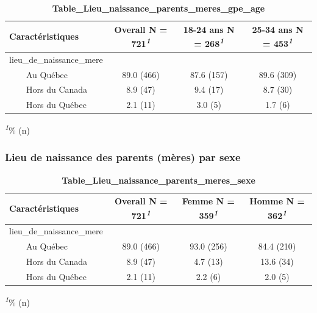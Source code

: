 \documentclass[
]{article}
\begin{document}
\newpage
\begin{table}[!t]
\caption{\label{tab:unnamed-chunk-29}\textbf{Table\_Lieu\_naissance\_parents\_meres\_gpe\_age}} 
\fontsize{12.0pt}{14.4pt}\selectfont
\begin{tabular*}{\linewidth}{@{\extracolsep{\fill}}lccc}
\toprule
\textbf{Caractéristiques} & \textbf{Overall}  N = 721\textsuperscript{\textit{1}} & \textbf{18-24 ans}  N = 268\textsuperscript{\textit{1}} & \textbf{25-34 ans}  N = 453\textsuperscript{\textit{1}} \\ 
\midrule\addlinespace[2.5pt]
lieu\_de\_naissance\_mere &  &  &  \\ 
    Au Québec & 89.0 (466) & 87.6 (157) & 89.6 (309) \\ 
    Hors du Canada & 8.9 (47) & 9.4 (17) & 8.7 (30) \\ 
    Hors du Québec & 2.1 (11) & 3.0 (5) & 1.7 (6) \\ 
\bottomrule
\end{tabular*}
\begin{minipage}{\linewidth}
\textsuperscript{\textit{1}}\% (n)\\
\end{minipage}
\end{table}

\vspace{2cm}

\hypertarget{lieu-de-naissance-des-parents-muxe8res-par-sexe}{%
\subsubsection{Lieu de naissance des parents (mères) par
sexe}\label{lieu-de-naissance-des-parents-muxe8res-par-sexe}}

\newpage
\begin{table}[!t]
\caption{\label{tab:unnamed-chunk-30}\textbf{Table\_Lieu\_naissance\_parents\_meres\_sexe}} 
\fontsize{12.0pt}{14.4pt}\selectfont
\begin{tabular*}{\linewidth}{@{\extracolsep{\fill}}lccc}
\toprule
\textbf{Caractéristiques} & \textbf{Overall}  N = 721\textsuperscript{\textit{1}} & \textbf{Femme}  N = 359\textsuperscript{\textit{1}} & \textbf{Homme}  N = 362\textsuperscript{\textit{1}} \\ 
\midrule\addlinespace[2.5pt]
lieu\_de\_naissance\_mere &  &  &  \\ 
    Au Québec & 89.0 (466) & 93.0 (256) & 84.4 (210) \\ 
    Hors du Canada & 8.9 (47) & 4.7 (13) & 13.6 (34) \\ 
    Hors du Québec & 2.1 (11) & 2.2 (6) & 2.0 (5) \\ 
\bottomrule
\end{tabular*}
\begin{minipage}{\linewidth}
\textsuperscript{\textit{1}}\% (n)\\
\end{minipage}
\end{table}
\vspace{2cm}
\end{document}
